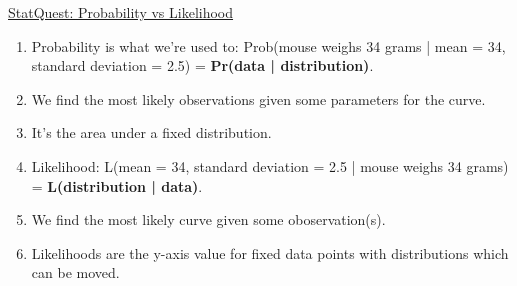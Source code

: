 \documentclass[12pt, titlepage, french]{report}
\begin{document}
\begin{YTB_SUMM}{\href{https://www.youtube.com/watch?v=pYxNSUDSFH4&feature=youtu.be}{StatQuest: Probability vs Likelihood}}
\begin{enumerate}
	\item	Probability is what we're used to: Prob(mouse weighs 34 grams | mean = 34, standard deviation = 2.5) = \textbf{Pr(data | distribution)}.
	\item[]	We find the most likely observations given some parameters for the curve. 
	\item[]	It's the area under a fixed distribution.
	\item	Likelihood: L(mean = 34, standard deviation = 2.5 | mouse weighs 34 grams) = \textbf{L(distribution | data)}.
	\item[]	We find the most likely curve given some oboservation(s).
	\item[]	Likelihoods are the y-axis value for fixed data points with distributions which can be moved.
\end{enumerate}
\end{YTB_SUMM}
\end{document}
